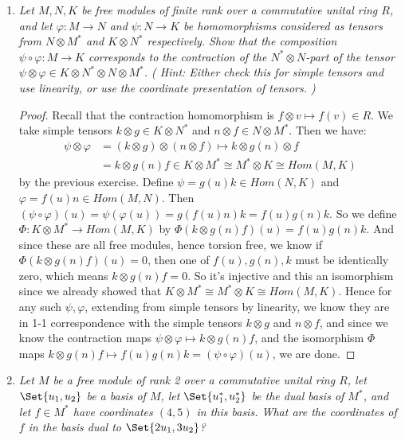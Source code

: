 \documentclass[9pt,reqno,twoside]{amsbook}
\theoremstyle{plain}
\numberwithin{section}{chapter}
\numberwithin{equation}{chapter}
\theoremstyle{definition}
\theoremstyle{remark}
\theoremstyle{plain}
\newcommand{\bb}{\vspace{3mm}}
\newcommand{\bee}{\begin{equation}\begin{aligned}}
\newcommand{\eee}{\end{aligned}\end{equation}}
\newcommand{\tens}{\otimes}
\renewcommand{\phi}{\varphi}
\begin{document}
\begin{enumerate}[label=\arabic*.]
\begin{enumerate}
\end{enumerate}



\bb            

\item \textit{Let $M,N,K$
be free modules of finite rank over a commutative unital ring
$R$, and let $\phi:M \to N$
and $\psi:N \to K$
be homomorphisms considered as tensors from $N \tens M^*$
and $K \tens N^*$
respectively. Show that the composition
$\psi \circ \phi:M \to K$ 
corresponds to the contraction
of the
$N^* \tens N$-part of the tensor
$\psi \tens \phi \in K \tens N^* \tens N \tens M^*$. (
Hint:
Either check this for simple
tensors and use linearity, or use the coordinate presentation of tensors.
)}


\begin{proof}
Recall that the contraction homomorphism is $f \tens v \mapsto f(v) \in R$. We take simple tensors $k \tens g \in K \tens N^*$ and $n \tens f \in N \tens M^*$. Then we have:
\bee
 \psi \tens \phi &= (k \tens g) \tens (n \tens f) \mapsto k \tens g(n) \tens f \\
 &= k \tens g(n)f \in K \tens M^* \cong M^* \tens K \cong Hom(M,K)
 \eee
  by the previous exercise. Define $\psi = g(u)k \in Hom(N,K)$ and $\phi = f(u)n \in Hom(M,N)$. Then $(\psi \circ \phi)(u) = \psi(\phi(u)) = g(f(u)n)k = f(u)g(n)k$. So we define $\Phi:K \tens M^* \to Hom(M,K)$ by $\Phi(k \tens g(n)f)(u) = f(u)g(n)k$. And since these are all free modules, hence torsion free, we know if $\Phi(k \tens g(n)f)(u) = 0$, then one of $f(u),g(n),k$ must be identically zero, which means $k \tens g(n)f = 0$. So it's injective and this an isomorphism since we already showed that $K \tens M^* \cong M^* \tens K \cong Hom(M,K)$. Hence for any such $\psi,\phi$, extending from simple tensors by linearity, we know they are in 1-1 correspondence with the simple tensors $k \tens g$ and $n \tens f$, and since we know the contraction maps $\psi \tens \phi \mapsto k \tens g(n)f$, and the isomorphism $\Phi$ maps $k \tens g(n)f \mapsto f(u)g(n)k = (\psi \circ \phi)(u)$, we are done. 
\end{proof}



\item \textit{Let $M$ be a free module of rank 2 over a commutative unital ring $R$, let $\Set{u_1,u_2}$ be a basis of $M$, let $\Set{u_1^*,u_2^*}$ be the dual basis of $M^*$, and let $f \in M^*$ have coordinates $(4,5)$ in this basis. What are the coordinates of $f$ in the basis dual to $\Set{2u_1,3u_2}$? }


\end{enumerate}
\end{document}
